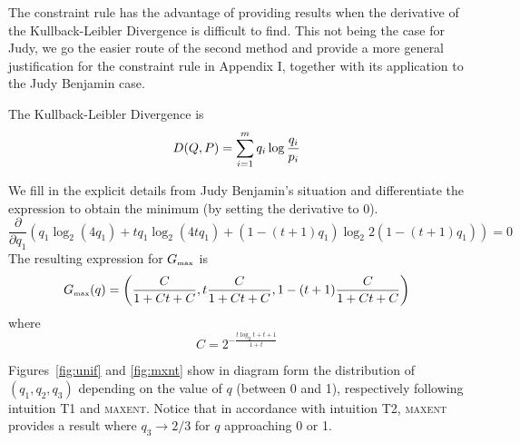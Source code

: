 \documentclass[12pt]{article}
\begin{document}
The constraint rule has the advantage of providing results when the
derivative of the Kullback-Leibler Divergence is difficult to find.
This not being the case for Judy, we go the easier route of the second
method and provide a more general justification for the constraint
rule in Appendix I, together with its application to the Judy
Benjamin case. 

The Kullback-Leibler Divergence is
\begin{equation}
  D(Q,P)=\sum_{i=1}^{m}q_{i}\log\frac{q_{i}}{p_{i}}\notag
\end{equation}

We fill in the explicit details from Judy Benjamin's situation and
differentiate the expression to obtain the minimum (by setting the
derivative to $0$). 
\begin{displaymath}
\frac{\partial}{\partial{}q_{1}}(q_{1}\log_{2}(4q_{1})+tq_{1}\log_{2}(4tq_{1})+(1-(t+1)q_{1})\log_{2}2(1-(t+1)q_{1}))=0
\end{displaymath}
The resulting expression for $G_{\mbox{\tiny max}}$ is
\begin{displaymath}
  G_{\mbox{\tiny max}}(q)=\left(\frac{C}{1+Ct+C},t\frac{C}{1+Ct+C},1-(t+1)\frac{C}{1+Ct+C}\right)
\end{displaymath}
where
\begin{displaymath}
  C=2^{-\frac{t\log_{2}t+t+1}{1+t}}
\end{displaymath}

Figures~\ref{fig:unif} and \ref{fig:mxnt} show in diagram form the
distribution of $(q_{1},q_{2},q_{3})$ depending on the value of $q$
(between 0 and 1), respectively following intuition T1 and
\textsc{maxent}. Notice that in accordance with intuition T2,
\textsc{maxent} provides a result where $q_{3}\rightarrow{}2/3$ for
$q$ approaching 0 or 1.
\end{document}
